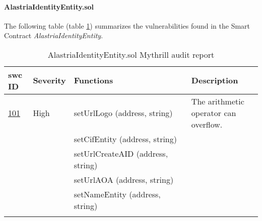 \paragraph{AlastriaIdentityEntity.sol}
The following table (table \ref{tab:AlastriaIdentityEntity}) summarizes the vulnerabilities found in the Smart Contract \textit{AlastriaIdentityEntity}.
\begin{longtable}{||p{0.1\linewidth} | p{0.11\linewidth} | p{0.5\linewidth} | p{0.3\linewidth}||}
    \hline
    \textbf{\acrshort{swc} ID}                      & \textbf{Severity} & \textbf{Functions}                & \textbf{Description}                  \\ [0.5ex]
    \hline\hline
    \href{https://swcregistry.io/docs/SWC-101}{101} & High              & setUrlLogo (address, string)      & The arithmetic operator can overflow. \\
    \cline{3-3}
                                                    &                   & setCifEntity (address, string)    &                                       \\
    \cline{3-3}
                                                    &                   & setUrlCreateAID (address, string) &                                       \\
    \cline{3-3}
                                                    &                   & setUrlAOA (address, string)       &                                       \\
    \cline{3-3}
                                                    &                   & setNameEntity (address, string)   &                                       \\[1ex]
    \hline
    \caption{AlastriaIdentityEntity.sol Mythrill audit report}
    \label{tab:AlastriaIdentityEntity}
\end{longtable}


